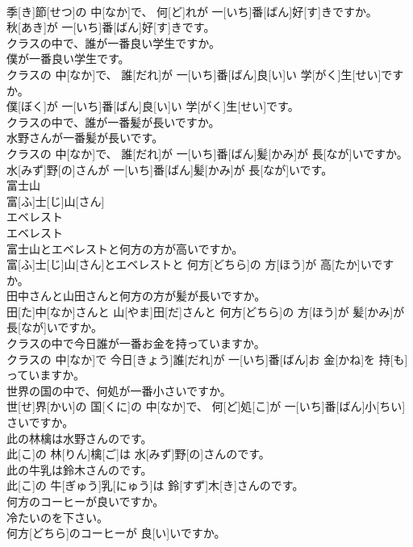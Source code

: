 \documentclass[8pt]{extreport}
\begin{document}
\begin{CJK}{UTF8}{min}
\\	季[き]節[せつ]の 中[なか]で、 何[ど]れが 一[いち]番[ばん]好[す]きですか。 
\\	秋[あき]が 一[いち]番[ばん]好[す]きです。
\\	クラスの中で、誰が一番良い学生ですか。 
\\	僕が一番良い学生です。	
\\	クラスの 中[なか]で、 誰[だれ]が 一[いち]番[ばん]良[い]い 学[がく]生[せい]ですか。 
\\	僕[ぼく]が 一[いち]番[ばん]良[い]い 学[がく]生[せい]です。
\\	クラスの中で、誰が一番髪が長いですか。 
\\	水野さんが一番髪が長いです。	
\\	クラスの 中[なか]で、 誰[だれ]が 一[いち]番[ばん]髪[かみ]が 長[なが]いですか。 
\\	水[みず]野[の]さんが 一[いち]番[ばん]髪[かみ]が 長[なが]いです。
\\	富士山	
\\	富[ふ]士[じ]山[さん]	
\\	エベレスト	
\\	エベレスト	
\\	富士山とエベレストと何方の方が高いですか。	
\\	富[ふ]士[じ]山[さん]とエベレストと 何方[どちら]の 方[ほう]が 高[たか]いですか。
\\	田中さんと山田さんと何方の方が髪が長いですか。	
\\	田[た]中[なか]さんと 山[やま]田[だ]さんと 何方[どちら]の 方[ほう]が 髪[かみ]が 長[なが]いですか。
\\	クラスの中で今日誰が一番お金を持っていますか。	
\\	クラスの 中[なか]で 今日[きょう]誰[だれ]が 一[いち]番[ばん]お 金[かね]を 持[も]っていますか。
\\	世界の国の中で、何処が一番小さいですか。	
\\	世[せ]界[かい]の 国[くに]の 中[なか]で、 何[ど]処[こ]が 一[いち]番[ばん]小[ちい]さいですか。
\\	此の林檎は水野さんのです。	
\\	此[こ]の 林[りん]檎[ご]は 水[みず]野[の]さんのです。
\\	此の牛乳は鈴木さんのです。	
\\	此[こ]の 牛[ぎゅう]乳[にゅう]は 鈴[すず]木[き]さんのです。
\\	何方のコーヒーが良いですか。 
\\	冷たいのを下さい。	
\\	何方[どちら]のコーヒーが 良[い]いですか。 

\end{CJK}
\end{document}

